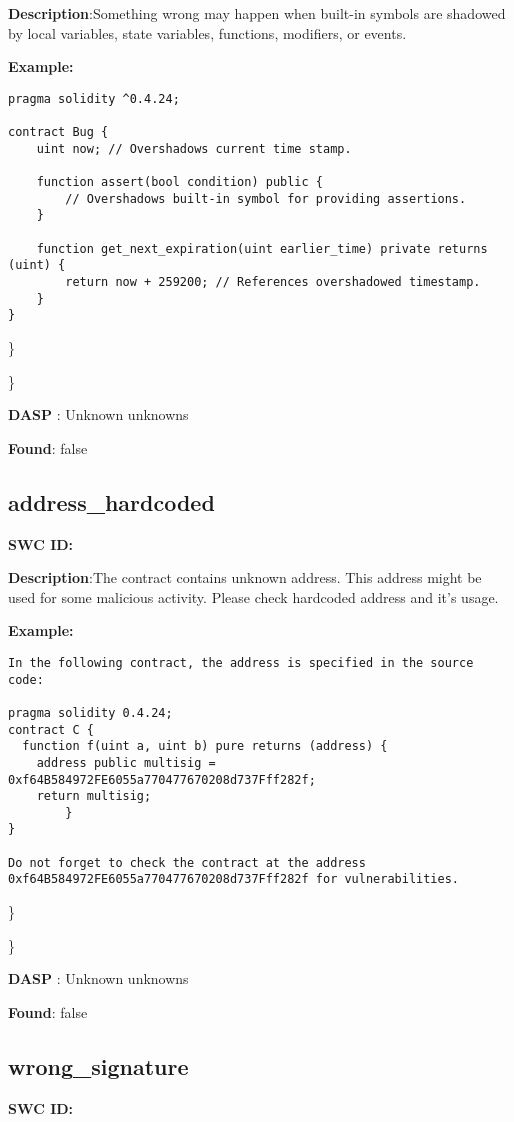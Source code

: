 \documentclass{article}
\begin{document}
\textbf{Description}:Something wrong may happen when built-in symbols are shadowed by local variables, state variables, functions, modifiers, or events.


\textbf{Example:} 
\begin{verbatim}
pragma solidity ^0.4.24;

contract Bug {
    uint now; // Overshadows current time stamp.

    function assert(bool condition) public {
        // Overshadows built-in symbol for providing assertions.
    }

    function get_next_expiration(uint earlier_time) private returns (uint) {
        return now + 259200; // References overshadowed timestamp.
    }
}

\end{verbatim}\} 

\} 

\textbf{DASP} : Unknown unknowns

\textbf{Found}: false

\subsection{address\_hardcoded} 
\textbf{SWC \textunderscore ID:} 

\textbf{Description}:The contract contains unknown address. This address might be used for some malicious activity. Please check hardcoded address and it's usage.


\textbf{Example:} 
\begin{verbatim}
In the following contract, the address is specified in the source code:

pragma solidity 0.4.24;
contract C {
  function f(uint a, uint b) pure returns (address) {
    address public multisig = 0xf64B584972FE6055a770477670208d737Fff282f;
    return multisig;
        }
}

Do not forget to check the contract at the address 0xf64B584972FE6055a770477670208d737Fff282f for vulnerabilities.

\end{verbatim}\} 

\} 

\textbf{DASP} : Unknown unknowns

\textbf{Found}: false

\subsection{wrong\_signature} 
\textbf{SWC \textunderscore ID:} 
\end{document}
